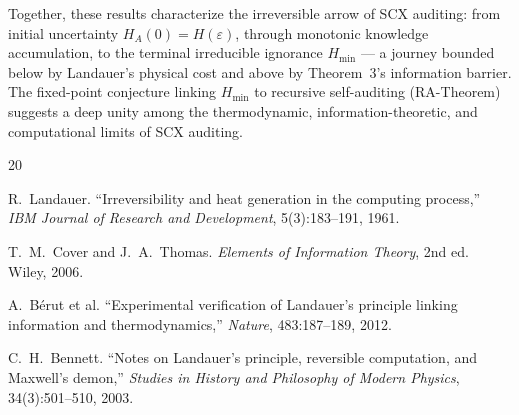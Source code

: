 \documentclass[12pt,a4paper]{article}
\begin{document}
Together, these results characterize the irreversible arrow of SCX auditing: from initial uncertainty $H_A(0)=H(\varepsilon)$, through monotonic knowledge accumulation, to the terminal irreducible ignorance $H_{\min}$ --- a journey bounded below by Landauer's physical cost and above by Theorem~3's information barrier. The fixed-point conjecture linking $H_{\min}$ to recursive self-auditing (RA-Theorem) suggests a deep unity among the thermodynamic, information-theoretic, and computational limits of SCX auditing.


\begin{thebibliography}{20}

R.~Landauer.
\newblock ``Irreversibility and heat generation in the computing process,''
\newblock \emph{IBM Journal of Research and Development}, 5(3):183--191, 1961.

T.~M.~Cover and J.~A.~Thomas.
\newblock \emph{Elements of Information Theory}, 2nd ed.
\newblock Wiley, 2006.

A.~B\'erut et al.
\newblock ``Experimental verification of Landauer's principle linking information and thermodynamics,''
\newblock \emph{Nature}, 483:187--189, 2012.

C.~H.~Bennett.
\newblock ``Notes on Landauer's principle, reversible computation, and Maxwell's demon,''
\newblock \emph{Studies in History and Philosophy of Modern Physics}, 34(3):501--510, 2003.

\end{thebibliography}
\end{document}
